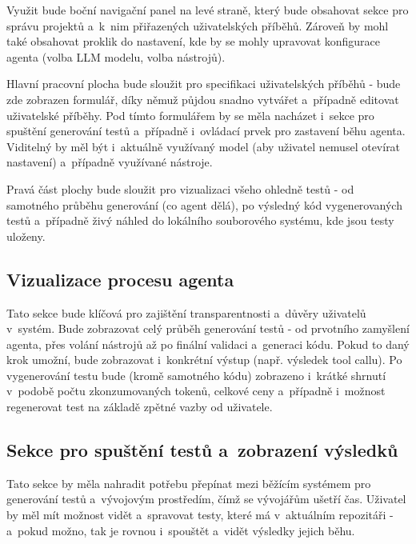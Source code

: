 \documentclass[czech, ing, kiv, he, iso690numb, viewonly]{fasthesis}
\begin{document}
Využit bude boční navigační panel na levé straně, který bude obsahovat sekce pro správu projektů a~k~nim přiřazených uživatelských příběhů.
Zároveň by mohl také obsahovat proklik do nastavení, kde by se mohly upravovat konfigurace agenta (volba LLM modelu, volba nástrojů).

Hlavní pracovní plocha bude sloužit pro specifikaci uživatelských příběhů - bude zde zobrazen formulář, díky němuž půjdou snadno vytvářet a~případně editovat 
uživatelské příběhy. Pod tímto formulářem by se měla nacházet i~sekce pro spuštění generování testů a~případně i~ovládací prvek pro zastavení běhu agenta.
Viditelný by měl být i~aktuálně využívaný model (aby uživatel nemusel otevírat nastavení) a~případně využívané nástroje.

Pravá část plochy bude sloužit pro vizualizaci všeho ohledně testů - od samotného průběhu generování (co agent dělá), po výsledný kód vygenerovaných testů a~případně živý náhled 
do lokálního souborového systému, kde jsou testy uloženy. 

\subsection*{Vizualizace procesu agenta}
Tato sekce bude klíčová pro zajištění transparentnosti a~důvěry uživatelů v~systém. 
Bude zobrazovat celý průběh generování testů - od prvotního zamyšlení agenta, přes volání nástrojů až po finální validaci a~generaci kódu. Pokud to 
daný krok umožní, bude zobrazovat i~konkrétní výstup (např. výsledek tool callu). Po vygenerování testu bude (kromě samotného kódu) zobrazeno 
i~krátké shrnutí v~podobě počtu zkonzumovaných tokenů, celkové ceny a~případně i~možnost regenerovat test na základě zpětné vazby od uživatele.

\subsection*{Sekce pro spuštění testů a~zobrazení výsledků}
Tato sekce by měla nahradit potřebu přepínat mezi běžícím systémem pro generování testů a~vývojovým prostředím, čímž se vývojářům ušetří čas.
Uživatel by měl mít možnost vidět a~spravovat testy, které má v~aktuálním repozitáři - a~pokud možno, tak je rovnou i~spouštět a~vidět výsledky jejich běhu.
\end{document}
